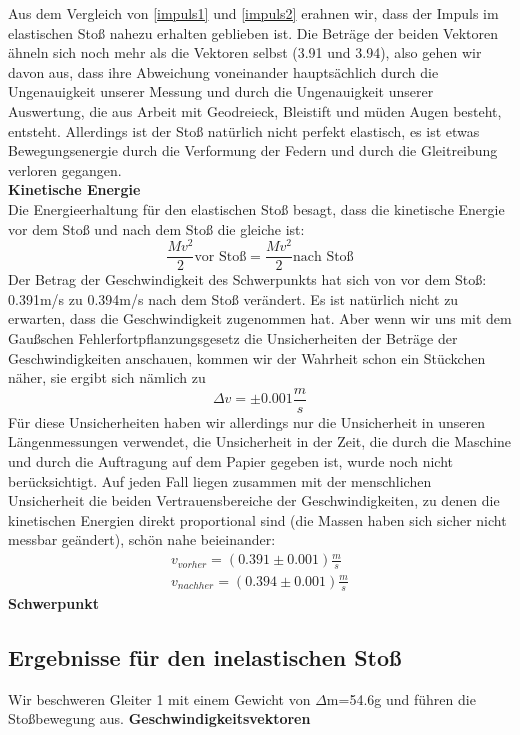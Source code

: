 \documentclass{article}
\begin{document}
Aus dem Vergleich von \ref{impuls1} und \ref{impuls2} erahnen wir, dass der Impuls im elastischen Stoß nahezu erhalten geblieben ist. Die Beträge der beiden Vektoren ähneln sich noch mehr als die Vektoren selbst (3.91 und 3.94), also gehen wir davon aus, dass ihre Abweichung voneinander hauptsächlich durch die Ungenauigkeit unserer Messung und durch die Ungenauigkeit unserer Auswertung, die aus Arbeit mit Geodreieck, Bleistift und müden Augen besteht, entsteht. Allerdings ist der Stoß natürlich nicht perfekt elastisch, es ist etwas Bewegungsenergie durch die Verformung der Federn und durch die Gleitreibung verloren gegangen. \\
\textbf{Kinetische Energie}\\
Die Energieerhaltung für den elastischen Stoß besagt, dass die kinetische Energie vor dem Stoß und nach dem Stoß die gleiche ist:
\begin{equation}
\frac{Mv^2}{2} \text{vor Stoß} = \frac{Mv^2}{2}  \text{nach Stoß} 
\end{equation}
Der Betrag der Geschwindigkeit des Schwerpunkts hat sich von vor dem Stoß: 0.391m/s zu 0.394m/s nach dem Stoß verändert. Es ist natürlich nicht zu erwarten, dass die Geschwindigkeit zugenommen hat. Aber wenn wir uns mit dem Gaußschen Fehlerfortpflanzungsgesetz die Unsicherheiten der Beträge der Geschwindigkeiten anschauen, kommen wir der Wahrheit schon ein Stückchen näher, sie ergibt sich nämlich zu 
\begin{equation}
\Delta v=\pm 0.001 \frac{m}{s}
\end{equation}
Für diese Unsicherheiten haben wir allerdings nur die Unsicherheit in unseren Längenmessungen verwendet, die Unsicherheit in der Zeit, die durch die Maschine und durch die Auftragung auf dem Papier gegeben ist, wurde noch nicht berücksichtigt. Auf jeden Fall liegen zusammen mit der menschlichen Unsicherheit die beiden Vertrauensbereiche der Geschwindigkeiten, zu denen die kinetischen Energien direkt proportional sind (die Massen haben sich sicher nicht messbar geändert), schön nahe beieinander:
\begin{gather*}
v_{vorher}=(0.391 \pm 0.001) \frac{m}{s} \\
v_{nachher}=( 0.394 \pm 0.001) \frac{m}{s}
\end{gather*}
\textbf{Schwerpunkt}


\subsection{Ergebnisse für den inelastischen Stoß}
Wir beschweren Gleiter 1 mit einem Gewicht von $\Delta$m=54.6g und führen die Stoßbewegung aus.
\textbf{Geschwindigkeitsvektoren}
\end{document}
